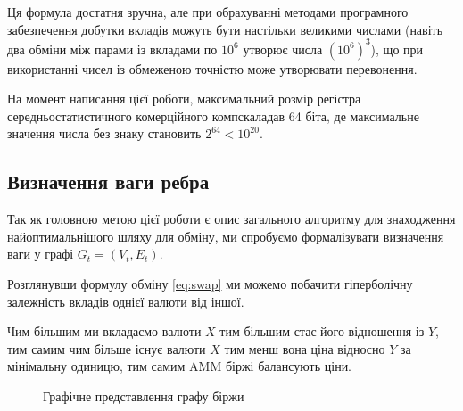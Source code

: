 \documentclass[a4paper, 12pt]{article}
\newcommand{\tqs}{\textquotesingle}
\begin{document}
%
%
%

Ця формула достатня зручна, але при обрахуванні методами програмного
забезпечення добутки вкладів можуть бути настільки великими числами (навіть два
обміни між парами із вкладами по \(10^6\) утворює числа \({(10^6)}^3\)), що при
використанні чисел із обмеженою точністю може утворювати перевонення.

На момент написання цієї роботи, максимальний розмір регістра
середньостатистичного комерційного комп скаладав 64 біта, де
максимальне значення числа без знаку становить \(2^{64} < 10^{20}\).

\subsection{Визначення ваги ребра}

Так як головною метою цієї роботи є опис загального алгоритму для знаходження
найоптимальнішого шляху для обміну, ми спробуємо формалізувати визначення ваги у
графі \(G_{t} = (V_{t}, E_{t})\).

Розглянувши формулу обміну \eqref{eq:swap} ми можемо побачити гіперболічну
залежність вкладів однієї валюти від іншої.

Чим більшим ми вкладаємо валюти \(X\) тим більшим стає його відношення із \(Y\),
тим самим чим більше існує валюти \(X\) тим менш вона ціна відносно \(Y\) за
мінімальну одиницю, тим самим AMM біржі балансують ціни.

\begin{figure}[h]
	\centering
	\caption{Графічне представлення графу біржи}\label{fig:amm-graph}
\end{figure}
\end{document}
